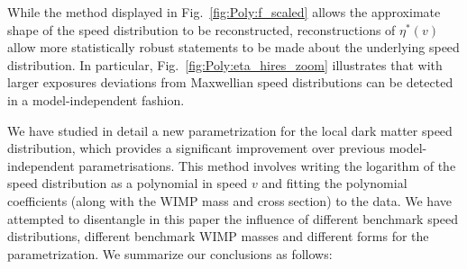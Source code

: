 While the method displayed in Fig.~\ref{fig:Poly:f_scaled} allows the approximate shape of the speed distribution to be reconstructed, reconstructions of $\eta^*(v)$ allow more statistically robust statements to be made about the underlying speed distribution. In particular, Fig.~\ref{fig:Poly:eta_hires_zoom} illustrates that with larger exposures deviations from Maxwellian speed distributions can be detected in a model-independent fashion.

\label{sec:Conclusions}

We have studied in detail a new parametrization for the local dark matter speed distribution, which provides a significant improvement over previous model-independent parametrisations. This method involves writing the logarithm of the speed distribution as a polynomial in speed $v$ and fitting the polynomial coefficients (along with the WIMP mass and cross section) to the data. We have attempted to disentangle in this paper the influence of  different benchmark speed distributions, different benchmark WIMP masses and different forms for the parametrization.  We summarize our conclusions as follows:


